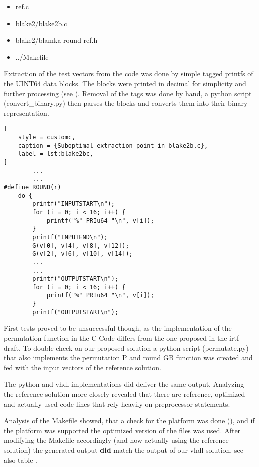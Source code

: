\begin{itemize}
\item ref.c
\item blake2/blake2b.c
\item blake2/blamka-round-ref.h
\item ../Makefile
\end{itemize}


Extraction of the test vectors from the code was done by simple tagged printfs
of the UINT64 data blocks. The blocks were printed in decimal for simplicity and further
processing (see ). Removal of the tags was done by hand, a python script (convert_binary.py) then parses the blocks and converts them into their binary representation.

\begin{lstlisting}[
	style = customc,
	caption = {Suboptimal extraction point in blake2b.c},
	label = lst:blake2bc,
]
		...
		...
#define ROUND(r)                       	
    do {                                	
		printf("INPUTSTART\n");			   	
		for (i = 0; i < 16; i++) {		   	
			printf("%" PRIu64 "\n", v[i]); 	
		}								   	
		printf("INPUTEND\n");			   	
		G(v[0], v[4], v[8], v[12]);        
		G(v[2], v[6], v[10], v[14]);    
		...
		...
		printf("OUTPUTSTART\n");			   	
		for (i = 0; i < 16; i++) {		   	
			printf("%" PRIu64 "\n", v[i]); 	
		}								   	
		printf("OUTPUTSTART\n");			   	

\end{lstlisting}

First tests proved to be unsuccessful though, as the implementation of the permutation
function in the C Code differs from the one proposed in the irtf-draft\autocite{irtf-draft}.
To double check on our proposed solution a python script (permutate.py) that also implements the
permutation P and round GB function was created and fed with the input vectors of the
reference solution.

The python and vhdl implementations did deliver the same output. Analyzing the reference
solution more closely revealed that there are reference, optimized and actually used code
lines that rely heavily on preprocessor statements. 

Analysis of the Makefile showed, that a check for the platform was done (), and if the
platform was supported the optimized version of the files was used.
After modifying the Makefile accordingly (and now actually using the reference solution)
the generated output \textbf{did} match the output of our vhdl solution, see also table
.


